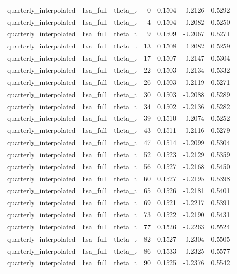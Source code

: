 \begin{tabular}{lllrrrr}
quarterly\_interpolated & hsa\_full & theta\_t & 0 & 0.1504 & -0.2126 & 0.5292 \\
quarterly\_interpolated & hsa\_full & theta\_t & 4 & 0.1504 & -0.2082 & 0.5250 \\
quarterly\_interpolated & hsa\_full & theta\_t & 9 & 0.1509 & -0.2067 & 0.5271 \\
quarterly\_interpolated & hsa\_full & theta\_t & 13 & 0.1508 & -0.2082 & 0.5259 \\
quarterly\_interpolated & hsa\_full & theta\_t & 17 & 0.1507 & -0.2147 & 0.5304 \\
quarterly\_interpolated & hsa\_full & theta\_t & 22 & 0.1503 & -0.2134 & 0.5332 \\
quarterly\_interpolated & hsa\_full & theta\_t & 26 & 0.1503 & -0.2119 & 0.5271 \\
quarterly\_interpolated & hsa\_full & theta\_t & 30 & 0.1503 & -0.2088 & 0.5289 \\
quarterly\_interpolated & hsa\_full & theta\_t & 34 & 0.1502 & -0.2136 & 0.5282 \\
quarterly\_interpolated & hsa\_full & theta\_t & 39 & 0.1510 & -0.2074 & 0.5252 \\
quarterly\_interpolated & hsa\_full & theta\_t & 43 & 0.1511 & -0.2116 & 0.5279 \\
quarterly\_interpolated & hsa\_full & theta\_t & 47 & 0.1514 & -0.2099 & 0.5304 \\
quarterly\_interpolated & hsa\_full & theta\_t & 52 & 0.1523 & -0.2129 & 0.5359 \\
quarterly\_interpolated & hsa\_full & theta\_t & 56 & 0.1527 & -0.2168 & 0.5450 \\
quarterly\_interpolated & hsa\_full & theta\_t & 60 & 0.1527 & -0.2195 & 0.5398 \\
quarterly\_interpolated & hsa\_full & theta\_t & 65 & 0.1526 & -0.2181 & 0.5401 \\
quarterly\_interpolated & hsa\_full & theta\_t & 69 & 0.1521 & -0.2217 & 0.5391 \\
quarterly\_interpolated & hsa\_full & theta\_t & 73 & 0.1522 & -0.2190 & 0.5431 \\
quarterly\_interpolated & hsa\_full & theta\_t & 77 & 0.1526 & -0.2263 & 0.5524 \\
quarterly\_interpolated & hsa\_full & theta\_t & 82 & 0.1527 & -0.2304 & 0.5505 \\
quarterly\_interpolated & hsa\_full & theta\_t & 86 & 0.1533 & -0.2325 & 0.5577 \\
quarterly\_interpolated & hsa\_full & theta\_t & 90 & 0.1525 & -0.2376 & 0.5542 \\

\end{tabular}
